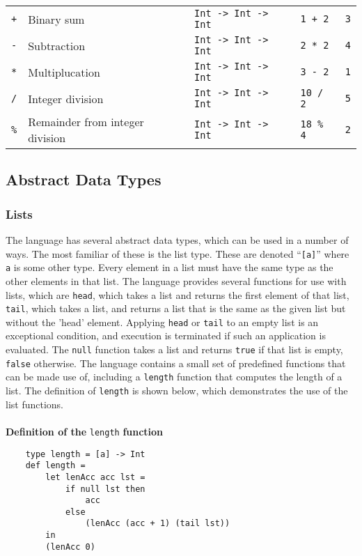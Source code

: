 \documentclass{article}
\begin{document}
{\begin{tabular}{ | p{13mm} | l | l | l | p{25mm} | }
    \texttt{+}      & Binary sum                        & \texttt{Int -> Int -> Int}            & \texttt{1 + 2}            & \texttt{3}                    \\
    \texttt{-}      & Subtraction                       & \texttt{Int -> Int -> Int}            & \texttt{2 * 2}            & \texttt{4}                    \\
    \texttt{*}      & Multiplucation                    & \texttt{Int -> Int -> Int}            & \texttt{3 - 2}            & \texttt{1}                    \\
    \texttt{/}      & Integer division                  & \texttt{Int -> Int -> Int}            & \texttt{10 / 2}           & \texttt{5}                    \\
    \texttt{\%}     & Remainder from integer division   & \texttt{Int -> Int -> Int}            & \texttt{18 \% 4}          & \texttt{2}                    \\
    \hline
\end{tabular}}

\subsection{Abstract Data Types}
\subsubsection{Lists}
The language has several abstract data types, which can be used in a number of ways. The most familiar of these is the list type. These are denoted ``\texttt{[a]}'' where \texttt{a} is some other type. Every element in a list must have the same type as the other elements in that list. The language provides several functions for use with lists, which are \texttt{head}, which takes a list and returns the first element of that list, \texttt{tail}, which takes a list, and returns a list that is the same as the given list but without the 'head' element. Applying \texttt{head} or \texttt{tail} to an empty list is an exceptional condition, and execution is terminated if such an application is evaluated. The \texttt{null} function takes a list and returns \texttt{true} if that list is empty, \texttt{false} otherwise. The language contains a small set of predefined functions that can be made use of, including a \texttt{length} function that computes the length of a list. The definition of \texttt{length} is shown below, which demonstrates the use of the list functions.
\\\\
\indent\textbf{Definition of the }\texttt{length}\textbf{ function}
\begin{verbatim}
    type length = [a] -> Int
    def length =
        let lenAcc acc lst =
            if null lst then
                acc
            else
                (lenAcc (acc + 1) (tail lst))
        in
        (lenAcc 0)
\end{verbatim}
\end{document}
